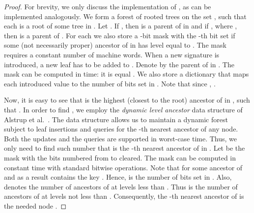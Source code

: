 \documentclass[a4paper]{article}
\theoremstyle{remark}
\begin{document}
\begin{proof}
For brevity, we only discuss the implementation of , as  can
be implemented analogously.
We form a forest  of rooted trees on the set , such that each
 is a root of some tree in .
Let .
If , then  is a parent of  in  and
if , where , then  is
a parent of .
For each  we also store a -bit mask  with
the -th bit set if some (not necessarily proper) ancestor of  in  has
level equal to .
The mask requires a constant number of machine words.
When a new signature  is introduced, a new leaf has to be added
to .
Denote by  the parent of  in .
The mask  can be computed in  time: it is equal
.
We also store a dictionary  that maps each introduced value 
to the number of bits set in .
Note that since , .

Now, it is easy to see that  is the highest (closest to the root)
ancestor  of  in , such that .
In order to find , we employ the \emph{dynamic level ancestor}
data structure of Alstrup et al.~\cite{Alstrup:2000}.
The data structure allows us to maintain a dynamic forest subject
to leaf insertions and queries for the -th nearest ancestor
of any node.
Both the updates and the queries are supported in worst-case  time.
Thus, we only need to find such number  that  is
the -th nearest ancestor of  in .
Let  be the mask  with the bits numbered from  to 
cleared.
The mask  can be computed in constant time with standard bitwise operations.
Note that  for some ancestor  of 
and as a result  contains the key .
Hence,  is the number of bits set in .
Also,  denotes the number of ancestors of  at levels less than .
Thus  is the number of ancestors
of  at levels not less than .
Consequently, the -th nearest ancestor of  is the needed node .
\end{proof}
\end{document}
